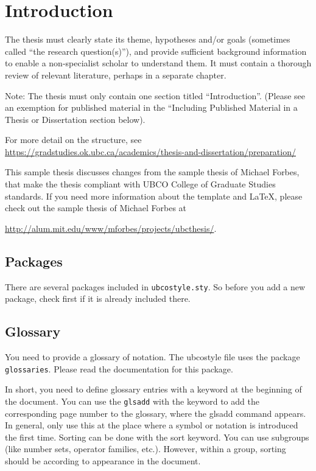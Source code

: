 \chapter{Introduction}
The thesis must clearly state its theme, hypotheses and/or goals (sometimes called “the research question(s)”), and provide sufficient background information to enable a non-specialist scholar to understand them. It must contain a thorough review of relevant literature, perhaps in a separate chapter.

Note: The thesis must only contain one section titled “Introduction”. (Please see an exemption for published material in the “Including Published Material in a Thesis or Dissertation section below). 

For more detail on the structure, see \url{https://gradstudies.ok.ubc.ca/academics/thesis-and-dissertation/preparation/}

This sample thesis discusses changes from the sample thesis of Michael Forbes, that make the thesis compliant with UBCO College of Graduate Studies standards. If you need more information about the template and LaTeX, please check out the sample thesis of Michael Forbes at

\href{http://alum.mit.edu/www/mforbes/projects/ubcthesis/}{http://alum.mit.edu/www/mforbes/projects/ubcthesis/}.

\cite{MR2848848,MR2461448,MR2834159,infconv,convmono,MR2668638,Bauschke:2007-PA02,proxbas}

\section{Packages}
There are several packages included in \texttt{ubcostyle.sty}. So before you add a new package, check first if it is already included there.

\section{Glossary}
You need to provide a glossary of notation. The ubcostyle file uses the package \texttt{glossaries}. Please read the documentation for this package.

In short, you need to define glossary entries with a keyword at the beginning of the document. You can use the \texttt{glsadd} with the keyword to add the corresponding page number to the glossary, where the glsadd command appears. In general, only use this at the place where a symbol or notation is introduced the first time. Sorting can be done with the sort keyword. You can use subgroups (like number sets, operator families, etc.). However, within a group, sorting should be according to appearance in the document.

